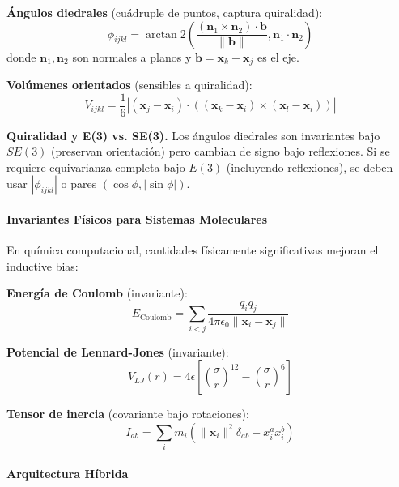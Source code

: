 \textbf{Ángulos diedrales} (cuádruple de puntos, captura quiralidad):
\begin{equation}
\phi_{ijkl} = \arctan2\left(\frac{(\mathbf{n}_1 \times \mathbf{n}_2) \cdot \mathbf{b}}{\|\mathbf{b}\|}, \mathbf{n}_1 \cdot \mathbf{n}_2\right)
\end{equation}
donde $\mathbf{n}_1, \mathbf{n}_2$ son normales a planos y $\mathbf{b} = \mathbf{x}_k - \mathbf{x}_j$ es el eje.

\textbf{Volúmenes orientados} (sensibles a quiralidad):
\begin{equation}
V_{ijkl} = \frac{1}{6} \left|(\mathbf{x}_j - \mathbf{x}_i) \cdot \left((\mathbf{x}_k - \mathbf{x}_i) \times (\mathbf{x}_l - \mathbf{x}_i)\right)\right|
\end{equation}

\textbf{Quiralidad y E(3) vs. SE(3).} Los ángulos diedrales son invariantes bajo $SE(3)$ (preservan orientación) pero cambian de signo bajo reflexiones. Si se requiere equivarianza completa bajo $E(3)$ (incluyendo reflexiones), se deben usar $|\phi_{ijkl}|$ o pares $(\cos \phi, |\sin \phi|)$.

\paragraph{Invariantes Físicos para Sistemas Moleculares}

En química computacional, cantidades físicamente significativas mejoran el inductive bias:

\textbf{Energía de Coulomb} (invariante):
\begin{equation}
E_{\text{Coulomb}} = \sum_{i < j} \frac{q_i q_j}{4\pi \epsilon_0 \|\mathbf{x}_i - \mathbf{x}_j\|}
\end{equation}

\textbf{Potencial de Lennard-Jones} (invariante):
\begin{equation}
V_{LJ}(r) = 4\epsilon \left[\left(\frac{\sigma}{r}\right)^{12} - \left(\frac{\sigma}{r}\right)^6\right]
\end{equation}

\textbf{Tensor de inercia} (covariante bajo rotaciones):
\begin{equation}
I_{ab} = \sum_i m_i \left(\|\mathbf{x}_i\|^2 \delta_{ab} - x_i^a x_i^b\right)
\end{equation}

\paragraph{Arquitectura Híbrida}

